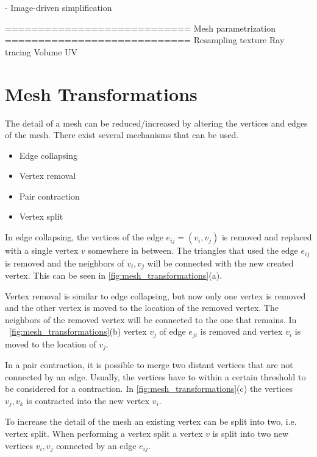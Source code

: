   - Image-driven simplification

============================
 Mesh parametrization
============================
  Resampling texture
  Ray tracing
  Volume UV
  
\fi %
  
\iffalse %
\section{Mesh Transformations} \label{sec:mesh_transformations}
The detail of a mesh can be reduced/increased by altering the vertices and edges of the mesh. There exist several mechanisms that can be used.

\begin{itemize}
\item Edge collapsing
\item Vertex removal
\item Pair contraction
\item Vertex split
\end{itemize}

In edge collapsing, the vertices of the edge $e_{ij} = (v_i, v_j)$ is removed and replaced with a single vertex $v$ somewhere in between. The triangles that used the edge $e_{ij}$ is removed and the neighbors of $v_i, v_j$ will be connected with the new created vertex. This can be seen in \cref{fig:mesh_transformations}(a).

Vertex removal is similar to edge collapsing, but now only one vertex is removed and the other vertex is moved to the location of the removed vertex. The neighbors of the removed vertex will be connected to the one that remains. In ~\cref{fig:mesh_transformations}(b) vertex $v_j$ of edge $e_{ji}$ is removed and vertex $v_i$ is moved to the location of $v_j$.

In a pair contraction, it is possible to merge two distant vertices that are not connected by an edge. Usually, the vertices have to within a certain threshold to be considered for a contraction. In \cref{fig:mesh_transformations}(c) the vertices $v_j, v_k$ is contracted into the new vertex $v_i$. 

To increase the detail of the mesh an existing vertex can be split into two, i.e. vertex split. When performing a vertex split a vertex $v$ is split into two new vertices $v_i, v_j$ connected by an edge $e_{ij}$. 

